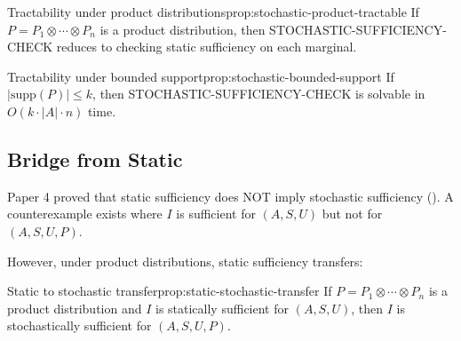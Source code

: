 \begin{claim}{Tractability under product distributions}{prop:stochastic-product-tractable}
If $P = P_1 \otimes \cdots \otimes P_n$ is a product distribution, then STOCHASTIC-SUFFICIENCY-CHECK reduces to checking static sufficiency on each marginal.
\end{claim}


\begin{claim}{Tractability under bounded support}{prop:stochastic-bounded-support}
If $|\text{supp}(P)| \leq k$, then STOCHASTIC-SUFFICIENCY-CHECK is solvable in $O(k \cdot |A| \cdot n)$ time.
\end{claim}


\subsection{Bridge from Static}

Paper 4 proved that static sufficiency does NOT imply stochastic sufficiency (). A counterexample exists where $I$ is sufficient for $(A,S,U)$ but not for $(A,S,U,P)$.

However, under product distributions, static sufficiency transfers:

\begin{claim}{Static to stochastic transfer}{prop:static-stochastic-transfer}
If $P = P_1 \otimes \cdots \otimes P_n$ is a product distribution and $I$ is statically sufficient for $(A,S,U)$, then $I$ is stochastically sufficient for $(A,S,U,P)$.
\end{claim}

